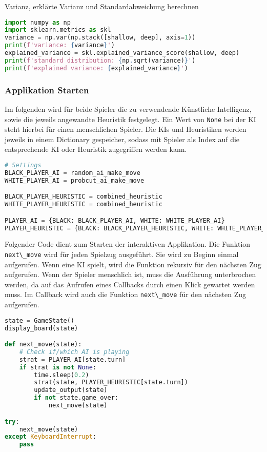 Varianz, erklärte Varianz und Standardabweichung berechnen

\begin{lstlisting}[language=Python]
import numpy as np
import sklearn.metrics as skl
variance = np.var(np.stack([shallow, deep], axis=1))
print(f'variance: {variance}')
explained_variance = skl.explained_variance_score(shallow, deep)
print(f'standard distribution: {np.sqrt(variance)}')
print(f'explained variance: {explained_variance}')
\end{lstlisting}

\hypertarget{applikation-starten}{%
\subsubsection{Applikation Starten}\label{applikation-starten}}

Im folgenden wird für beide Spieler die zu verwendende Künstliche
Intelligenz, sowie die jeweils angewandte Heuristik festgelegt. Ein Wert
von \passthrough{\lstinline!None!} bei der KI steht hierbei für einen
menschlichen Spieler. Die KIs und Heuristiken werden jeweils in einem
Dictionary gespeicher, sodass mit Spieler als Index auf die
entsprechende KI oder Heuristik zugegriffen werden kann.

\begin{lstlisting}[language=Python]
# Settings
BLACK_PLAYER_AI = random_ai_make_move
WHITE_PLAYER_AI = probcut_ai_make_move

BLACK_PLAYER_HEURISTIC = combined_heuristic
WHITE_PLAYER_HEURISTIC = combined_heuristic

PLAYER_AI = {BLACK: BLACK_PLAYER_AI, WHITE: WHITE_PLAYER_AI}
PLAYER_HEURISTIC = {BLACK: BLACK_PLAYER_HEURISTIC, WHITE: WHITE_PLAYER_HEURISTIC}
\end{lstlisting}

Folgender Code dient zum Starten der interaktiven Applikation. Die
Funktion \passthrough{\lstinline!next\_move!} wird für jeden Spielzug
ausgeführt. Sie wird zu Beginn einmal aufgerufen. Wenn eine KI spielt,
wird die Funktion rekursiv für den nächsten Zug aufgerufen. Wenn der
Spieler menschlich ist, muss die Ausführung unterbrochen werden, da auf
das Aufrufen eines Callbacks durch einen Klick gewartet werden muss. Im
Callback wird auch die Funktion \passthrough{\lstinline!next\_move!} für
den nächsten Zug aufgerufen.

\begin{lstlisting}[language=Python]
state = GameState()
display_board(state)

def next_move(state):
    # Check if/which AI is playing
    strat = PLAYER_AI[state.turn]
    if strat is not None:
        time.sleep(0.2)
        strat(state, PLAYER_HEURISTIC[state.turn])
        update_output(state)
        if not state.game_over:
            next_move(state)

try:
    next_move(state)
except KeyboardInterrupt:
    pass
\end{lstlisting}


